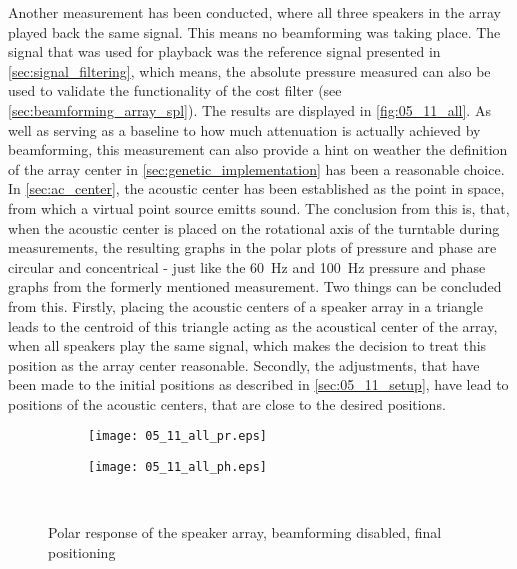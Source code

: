 Another measurement has been conducted, where all three speakers in the array played back the same signal. This means no beamforming was taking place. The signal that was used for playback was the reference signal presented in \autoref{sec:signal_filtering}, which means, the absolute pressure measured can also be used to validate the functionality of the cost filter (see \autoref{sec:beamforming_array_spl}). The results are displayed in \autoref{fig:05_11_all}. As well as serving as a baseline to how much attenuation is actually achieved by beamforming, this measurement can also provide a hint on weather the definition of the array center in \autoref{sec:genetic_implementation} has been a reasonable choice.
In \autoref{sec:ac_center}, the acoustic center has been established as the point in space, from which a virtual point source emitts sound. The conclusion from this is, that, when the acoustic center is placed on the rotational axis of the turntable during measurements, the resulting graphs in the polar plots of pressure and phase are circular and concentrical - just like the \SI{60}{\hertz} and \SI{100}{\hertz} pressure and phase graphs from the formerly mentioned measurement. 
Two things can be concluded from this. Firstly, placing the acoustic centers of a speaker array in a triangle leads to the centroid of this triangle acting as the acoustical center of the array, when all speakers play the same signal, which makes the decision to treat this position as the array center reasonable. Secondly, the adjustments, that have been made to the initial positions as described in \autoref{sec:05_11_setup}, have lead to positions of the acoustic centers, that are close to the desired positions.

\begin{figure}[h]
\begin{subfigure}[c]{0.5\textwidth}
\texttt{[image: 05\_11\_all\_pr.eps]}
\label{fig:05_11_all_pr}
\end{subfigure}
\begin{subfigure}[c]{0.5\textwidth}
\texttt{[image: 05\_11\_all\_ph.eps]}
\label{fig:05_11_all_ph}
\end{subfigure}\\
\caption{Polar response of the speaker array, beamforming disabled, final positioning}  
\label{fig:05_11_all}
\end{figure}

